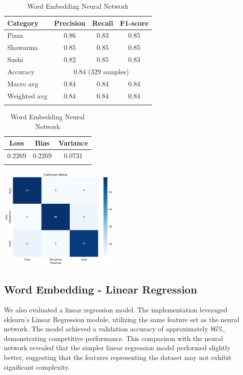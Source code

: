 \begin{table}[h]
    \centering
    \begin{tabular}{lccc}
        \hline
        Category     & Precision                              & Recall & F1-score \\
        \hline
        Pizza        & 0.86                                   & 0.83   & 0.85     \\
        Shawarma     & 0.85                                   & 0.85   & 0.85     \\
        Sushi        & 0.82                                   & 0.85   & 0.83     \\
        \hline
        Accuracy     & \multicolumn{3}{c}{0.84 (329 samples)}                     \\
        Macro avg    & 0.84                                   & 0.84   & 0.84     \\
        Weighted avg & 0.84                                   & 0.84   & 0.84     \\
        \hline                                                                    \\
    \end{tabular}
    \begin{tabular}{ccc}
        \hline
        Loss   & Bias   & Variance \\
        \hline
        0.2269 & 0.2269 & 0.0731   \\
        \hline                     \\
    \end{tabular}
    \includegraphics[width=0.45\textwidth]{model/neuralnetwork_confusion.png}
    \caption{Word Embedding Neural Network}
\end{table}

\subsection{Word Embedding - Linear Regression}
We also evaluated a linear regression model. The implementation leveraged sklearn's Linear Regression module, utilizing the same feature set as the neural network. The model achieved a validation accuracy of approximately 86\%, demonstrating competitive performance. This comparison with the neural network revealed that the simpler linear regression model performed slightly better, suggesting that the features representing the dataset may not exhibit significant complexity.

